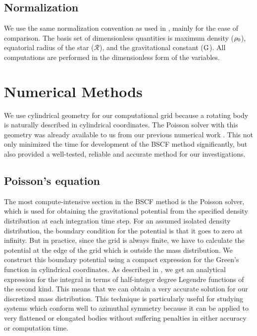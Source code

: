 \documentclass[a4paper,fleqn,usenatbib]{mnras}
\begin{document}
\subsection{Normalization}

We use the same normalization convention as used in \cite{Hachisu1986a}, mainly for the ease of comparison. The basis set of dimensionless quantities is maximum density (${\rm \rho_{0}}$), equatorial radius of the star ($\mathcal R$), and the gravitational constant (${\rm G}$). All computations are performed in the dimensionless form of the variables. 


\section{Numerical Methods}

We use cylindrical geometry for our computational grid because a rotating body is naturally described in cylindrical coordinates.
The Poisson solver with this geometry was already available to us from our previous numerical work \citep{Motl2002}. This not only minimized the time for development of the BSCF method significantly, but also provided a well-tested, reliable and accurate method for our investigations.

\subsection{Poisson's equation}

The most compute-intensive section in the BSCF method is the Poisson solver, which is used for obtaining the gravitational potential from the specified density distribution at each integration time step.
For an assumed isolated density distribution, the boundary condition for the potential is that it goes to zero at infinity. 
But in practice, since the grid is always finite, we have to calculate the potential at the edge of the grid which is outside the mass distribution.  
We construct this boundary potential using a compact expression for the Green's function in cylindrical coordinates. As described in \cite{Tohline1999}, we get an analytical expression for the integral in terms of half-integer degree Legendre functions of the second kind. This means that we can obtain a very accurate solution for our discretized mass distribution. This technique is particularly useful for studying systems which conform well to azimuthal symmetry  because it can be applied to very flattened or elongated bodies without suffering penalties in either accuracy or computation time. 
\end{document}
